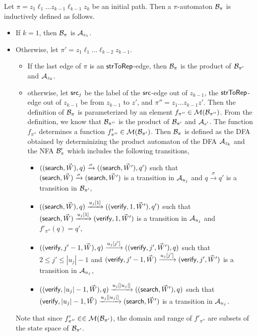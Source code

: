 \documentclass{llncs}
\begin{document}
\begin{definition}[$\pi$-automaton]\label{def-pi-aut}
Let $\pi=z_1 \ell_1 \dots z_{k-1} \ell_{k-1} z_k$ be an initial path.  Then a $\pi$-automaton $\mathcal{B}_\pi$ is inductively defined as follows. 
\begin{itemize}
\item If $k=1$, then $\mathcal{B}_\pi$ is $\mathcal{A}_{z_1}$.
%
\item Otherwise, let $\pi' = z_1 \ell_1 \dots \ell_{k-2}z_{k-1}$.
\begin{itemize} 
\item If the last edge of $\pi$ is an $\mathsf{strToRep}$-edge, then $\mathcal{B}_\pi$ is the product of $\mathcal{B}_{\pi'}$ and $\mathcal{A}_{z_k}$.

\item otherwise, let $\mathsf{src}_j$ be the label of the $\mathsf{src}$-edge out of $z_{k-1}$, the $\mathsf{strToRep}$-edge out of $z_{k-1}$ be from $z_{k-1}$ to $z'$, and $\pi'' = z_1 \dots z_{k-1} z'$. Then the definition of $\mathcal{B}_\pi$ is parameterized by an element $f_{\pi''} \in \mathcal{M}(\mathcal{B}_{\pi''})$. From the definition, we know that $\mathcal{B}_{\pi''}$ is the product of $\mathcal{B}_{\pi'}$ and $\mathcal{A}_{z'}$. The function $f_{\pi''}$ determines a function $f'_{\pi''} \in \mathcal{M}(\mathcal{B}_{\pi'})$. Then $\mathcal{B}_\pi$ is defined as the DFA obtained by determinizing the product automaton of the DFA $\mathcal{A}_{z_k}$ and the NFA $\mathcal{B}'_{\pi}$ which includes the following transitions,
\begin{itemize}
\item $((\mathsf{search}, \vec{W}), q) \xrightarrow{\sigma} ((\mathsf{search}, \vec{W}'), q')$ such that $(\mathsf{search}, \vec{W}) \xrightarrow{\sigma} (\mathsf{search}, \vec{W}')$ is a transition in $\mathcal{A}_{u_j}$ and $q \xrightarrow{\sigma} q'$ is a transition in $\mathcal{B}_{\pi'}$,
\item $((\mathsf{search}, \vec{W}), q) \xrightarrow{u_j[1]} ((\mathsf{verify}, 1, \vec{W}'), q')$ such that  $(\mathsf{search}, \vec{W}) \xrightarrow{u_j[1]} (\mathsf{verify},1,  \vec{W}')$ is a transition in $\mathcal{A}_{u_j}$ and $f'_{\pi''}(q)=q'$,
\item $((\mathsf{verify}, j'-1, \vec{W}), q) \xrightarrow{u_j[j']} ((\mathsf{verify}, j', \vec{W}'), q)$ such that $2 \le j' \le |u_j |-1$ and $(\mathsf{verify}, j'-1, \vec{W}) \xrightarrow{u_j[j']} (\mathsf{verify},j',  \vec{W}')$ is a transition in $\mathcal{A}_{u_j}$,
\item $((\mathsf{verify}, |u_j|-1, \vec{W}),q) \xrightarrow{u_j[|u_j|]} ((\mathsf{search}, \vec{W}'),q)$ such that $(\mathsf{verify}, |u_j|-1, \vec{W}) \xrightarrow{u_j[|u_j|]} (\mathsf{search}, \vec{W}')$ is a transition in $\mathcal{A}_{u_j}$.
\end{itemize}
\end{itemize}
Note that since $f'_{\pi''} \in  \in \mathcal{M}(\mathcal{B}_{\pi'})$, the domain and range of $f'_{\pi''}$ are subsets of the state space of $\mathcal{B}_{\pi'}$. 
\end{itemize}
\end{definition}
\end{document}
